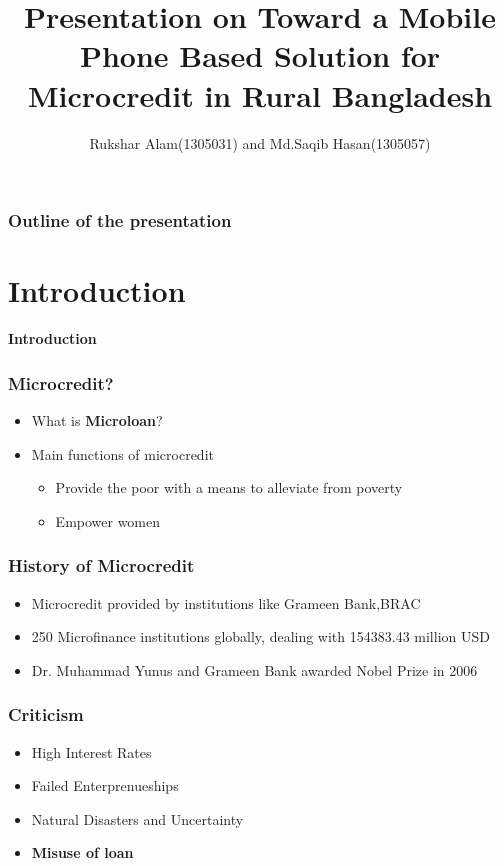 \documentclass{beamer}
\title[Beamer Presentation]{Presentation on \textbf{Toward a Mobile Phone Based Solution for Microcredit in Rural Bangladesh}}
\author[1305031, 1305057]{Rukshar Alam(1305031) and Md.Saqib Hasan(1305057)}
\institute[BUET]{Bangladesh University of Engineering and Technology}
\begin{document}
\begin{frame}
\titlepage
\end{frame}

\begin{frame}
\frametitle{Outline of the presentation}
\tableofcontents
\end{frame}

\section{Introduction}
\begin{frame}

\begin{center}
{\LARGE \textbf{Introduction}}
\end{center}

\end{frame}

\begin{frame}
\frametitle{Microcredit?}
\begin{itemize}
\item What is \textbf{Microloan}?
\item Main functions of microcredit
\begin{itemize}
\item Provide the poor with a means to alleviate from poverty
\item Empower women
\end{itemize}
\end{itemize}
\end{frame}

\begin{frame}
\frametitle{History of Microcredit}
\begin{itemize}
\item Microcredit provided by institutions like Grameen Bank,BRAC
\item 250 Microfinance institutions globally, dealing with 154383.43 million USD
\item Dr. Muhammad Yunus and Grameen Bank awarded Nobel Prize in 2006
\end{itemize}
\end{frame}

\begin{frame}
\frametitle{Criticism}
\begin{itemize}
\item High Interest Rates
\item Failed Enterprenueships
\item Natural Disasters and Uncertainty
\item \textbf{Misuse of loan}
\end{itemize}
\end{frame}
\end{document}

